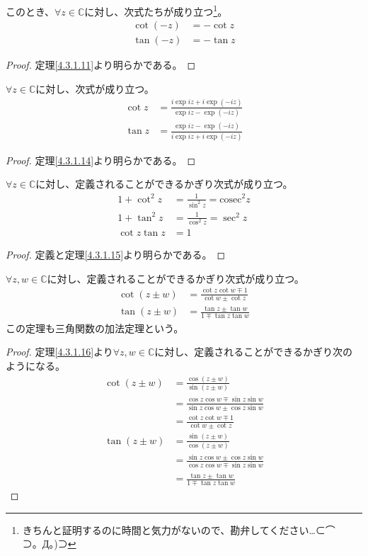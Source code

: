 \documentclass[dvipdfmx]{jsarticle}
\begin{document}
\begin{thm}\label{4.3.1.25}
このとき、$\forall z \in \mathbb{C}$に対し、次式たちが成り立つ\footnote{きちんと証明するのに時間と気力がないので、勘弁してください…⊂⌒　⊃。Д。)⊃}。
\begin{align*}
\cot( - z) &= - \cot z\\
\tan( - z) &= - \tan z
\end{align*}
\end{thm}
\begin{proof} 定理\ref{4.3.1.11}より明らかである。
\end{proof}
\begin{thm}\label{4.3.1.26} $\forall z \in \mathbb{C}$に対し、次式が成り立つ。
\begin{align*}
\cot z &= \frac{i\exp{iz} + i\exp( - iz)}{\exp{iz} - \exp( - iz)}\\
\tan z &= \frac{\exp{iz} - \exp( - iz)}{i\exp{iz} + i\exp( - iz)}
\end{align*}
\end{thm}
\begin{proof} 定理\ref{4.3.1.14}より明らかである。
\end{proof}
\begin{thm}\label{4.3.1.27}
$\forall z \in \mathbb{C}$に対し、定義されることができるかぎり次式が成り立つ。
\begin{align*}
1 + \cot^{2}z &= \frac{1}{\sin^{2}z} = {\mathrm{cosec}}^{2}z\\
1 + \tan^{2}z &= \frac{1}{\cos^{2}z} = \sec^{2}z\\
\cot z\tan z &= 1
\end{align*}
\end{thm}
\begin{proof} 定義と定理\ref{4.3.1.15}より明らかである。
\end{proof}
\begin{thm}[三角関数の加法定理]\label{4.3.1.28}
$\forall z,w \in \mathbb{C}$に対し、定義されることができるかぎり次式が成り立つ。
\begin{align*}
\cot(z \pm w) &= \frac{\cot z\cot w \mp 1}{\cot w \pm \cot z}\\
\tan(z \pm w) &= \frac{\tan z \pm \tan w}{1 \mp \tan z\tan w}
\end{align*}
この定理も三角関数の加法定理という。
\end{thm}
\begin{proof} 定理\ref{4.3.1.16}より$\forall z,w \in \mathbb{C}$に対し、定義されることができるかぎり次のようになる。
\begin{align*}
\cot(z \pm w) &= \frac{\cos(z \pm w)}{\sin(z \pm w)}\\
&= \frac{\cos z\cos w \mp \sin z\sin w}{\sin z\cos w \pm \cos z\sin w}\\
&= \frac{\cot z\cot w \mp 1}{\cot w \pm \cot z}\\
\tan(z \pm w) &= \frac{\sin(z \pm w)}{\cos(z \pm w)}\\
&= \frac{\sin z\cos w \pm \cos z\sin w}{\cos z\cos w \mp \sin z\sin w}\\
&= \frac{\tan z \pm \tan w}{1 \mp \tan z\tan w}
\end{align*}
\end{proof}
\end{document}

